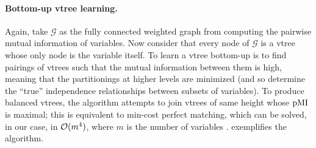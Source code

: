 \paragraph{Bottom-up vtree learning.} Again, take $\mathcal{G}$ as the fully connected weighted
graph from computing the pairwise mutual information of variables. Now consider that every node of
$\mathcal{G}$ is a vtree whose only node is the variable itself. To learn a vtree bottom-up is to
find pairings of vtrees such that the mutual information between them is high, meaning that the
partitionings at higher levels are minimized (and so determine the ``true'' independence
relationships between subsets of variables). To produce balanced vtrees, the algorithm attempts to
join vtrees of same height whose $\operatorname{\normalfont{pMI}}$ is maximal; this is equivalent to min-cost perfect
matching, which can be solved, in our case, in $\mathcal{O}(m^4)$, where $m$ is the number of variables
\citep{edmonds65,kolmogorov09}.  exemplifies the algorithm.

